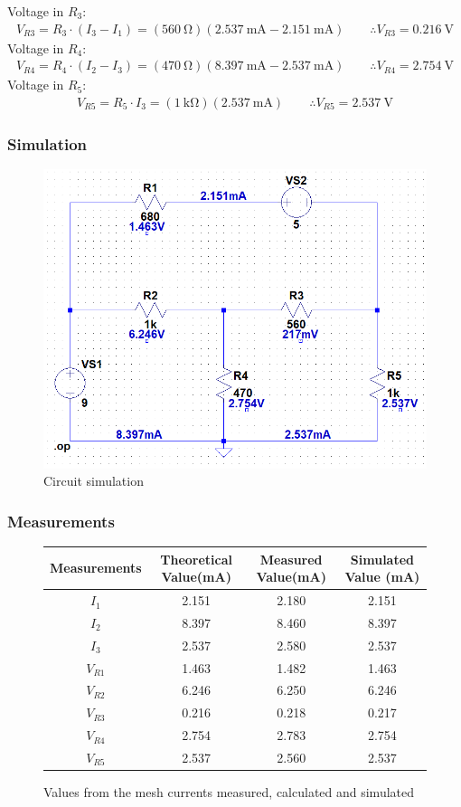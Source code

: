\documentclass[letterpaper]{article}
\begin{document}
Voltage in $R_3$:
\begin{gather*}V_{R3} = R_3\cdot(I_3-I_1)
    =(\SI{560}{\ohm})(\SI{2.537}{\milli\ampere}-\SI{2.151}{\milli\ampere})\qquad\therefore V_{R3} =
\SI{0.216}{\volt}
\end{gather*}
Voltage in $R_4$:
\begin{gather*}V_{R4} = R_4\cdot(I_2-I_3)
    =(\SI{470}{\ohm})(\SI{8.397}{\milli\ampere}-\SI{2.537}{\milli\ampere})\qquad\therefore V_{R4} =
\SI{2.754}{\volt}
\end{gather*}
Voltage in $R_5$:
\begin{gather*}V_{R5} = R_5\cdot I_3
    =(\SI{1}{\kilo\ohm})(\SI{2.537}{\milli\ampere})\qquad\therefore V_{R5} =
\SI{2.537}{\volt}
\end{gather*}
\subsubsection{Simulation}
\begin{figure}[H]
    \centering
    \includegraphics[width=.65\linewidth]{sim1}
    \caption{Circuit simulation}
\end{figure}
\subsubsection{Measurements}
\begin{figure}[H]
    \centering
    \begin{tabular}{|c|c|c|c|}\hline
        Measurements & Theoretical Value(\si{\milli\ampere}) & Measured Value(\si{\milli\ampere}) &
        Simulated Value (\si{\milli\ampere})\\\hline
        $I_{1}$ & 2.151 & 2.180 & 2.151 \\\hline
        $I_{2}$ & 8.397 & 8.460 & 8.397 \\\hline
        $I_{3}$ & 2.537 & 2.580 & 2.537 \\\hline
        $V_{R1}$ & 1.463 & 1.482 & 1.463 \\\hline 
        $V_{R2}$ & 6.246 & 6.250 & 6.246 \\\hline 
        $V_{R3}$ & 0.216 & 0.218 & 0.217 \\\hline 
        $V_{R4}$ & 2.754 & 2.783 & 2.754 \\\hline 
        $V_{R5}$ & 2.537 & 2.560 & 2.537 \\\hline 
    \end{tabular}
    \caption{Values from the mesh currents measured, calculated and simulated}
\end{figure}
\end{document}
